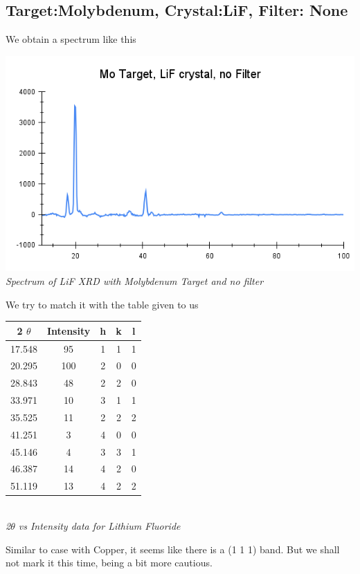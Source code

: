 \documentclass[]{report}[12 pt]
\begin{document}
\subsection*{Target:Molybdenum, Crystal:LiF, Filter: None}
We obtain a spectrum like this\\
\begin{center}
	\includegraphics[width=10 cm]{Mo Target, LiF crystal, No Filter.png}\\
	\textit{Spectrum of LiF XRD with Molybdenum Target and no filter}
\end{center}
We try to match it with the table given to us

\begin{center}
	\begin{tabular}{|c|c|c|c|c|}
		\hline
		2 $\theta$ & Intensity & h & k & l \\
		\hline
		17.548 & 95 & 1 & 1 & 1 \\
		\hline
		20.295 & 100 & 2 & 0 & 0 \\
		\hline
		28.843 & 48 & 2 & 2 & 0 \\
		\hline
		33.971 & 10 & 3 & 1 & 1 \\
		\hline
		35.525 & 11 & 2 & 2 & 2 \\
		\hline
		41.251 & 3 & 4 & 0 & 0 \\
		\hline
		45.146 & 4 & 3 & 3 & 1 \\
		\hline
		46.387 & 14 & 4 & 2 & 0 \\
		\hline
		51.119 & 13 & 4 & 2 & 2 \\
		\hline
	\end{tabular}\\
	\textit{2$\theta$ vs Intensity data for Lithium Fluoride}
\end{center}
Similar to case with Copper, it seems like there is a (1 1 1) band. But we shall not mark it this time, being a bit more cautious.
\end{document}
